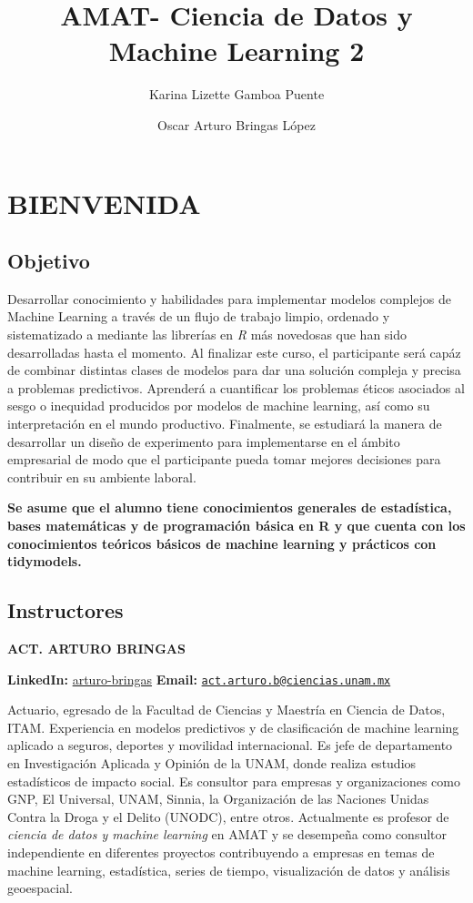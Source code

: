 \documentclass[
]{book}
\title{AMAT- Ciencia de Datos y Machine Learning 2}
\author{Karina Lizette Gamboa Puente \and Oscar Arturo Bringas López}
\date{}
\begin{document}
\maketitle

{
\setcounter{tocdepth}{1}
\tableofcontents
}
\hypertarget{bienvenida}{%
\chapter{BIENVENIDA}\label{bienvenida}}

\hypertarget{objetivo}{%
\section{Objetivo}\label{objetivo}}

Desarrollar conocimiento y habilidades para implementar modelos complejos de Machine Learning a través de un flujo de trabajo limpio, ordenado y sistematizado a mediante las librerías en \emph{R} más novedosas que han sido desarrolladas hasta el momento. Al finalizar este curso, el participante será capáz de combinar distintas clases de modelos para dar una solución compleja y precisa a problemas predictivos. Aprenderá a cuantificar los problemas éticos asociados al sesgo o inequidad producidos por modelos de machine learning, así como su interpretación en el mundo productivo. Finalmente, se estudiará la manera de desarrollar un diseño de experimento para implementarse en el ámbito empresarial de modo que el participante pueda tomar mejores decisiones para contribuir en su ambiente laboral.

\textbf{Se asume que el alumno tiene conocimientos generales de estadística, bases matemáticas y de programación básica en R y que cuenta con los conocimientos teóricos básicos de machine learning y prácticos con tidymodels.}

\hypertarget{instructores}{%
\section{Instructores}\label{instructores}}

\textbf{ACT. ARTURO BRINGAS}

\textbf{LinkedIn:} \href{https://www.linkedin.com/in/arturo-bringas/}{arturo-bringas}
\textbf{Email:} \href{mailto:act.arturo.b@ciencias.unam.mx}{\nolinkurl{act.arturo.b@ciencias.unam.mx}}

Actuario, egresado de la Facultad de Ciencias y Maestría en Ciencia de Datos, ITAM.
Experiencia en modelos predictivos y de clasificación de machine learning aplicado a seguros, deportes y movilidad internacional. Es jefe de departamento en Investigación Aplicada y Opinión de la UNAM, donde realiza estudios estadísticos de impacto social. Es consultor para empresas y organizaciones como GNP, El Universal, UNAM, Sinnia, la Organización de las Naciones Unidas Contra la Droga y el Delito (UNODC), entre otros. Actualmente es profesor de \emph{ciencia de datos y machine learning} en AMAT y se desempeña como consultor independiente en diferentes proyectos contribuyendo a empresas en temas de machine learning, estadística, series de tiempo, visualización de datos y análisis geoespacial.
\end{document}
